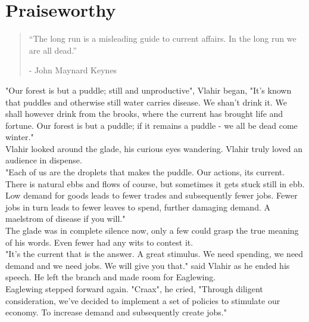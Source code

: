 \documentclass[smalldemyvopaper,11pt,twoside,onecolumn,openright,extrafontsizes]{memoir}
\newlength\drop
\begin{document}
\chapter{Praiseworthy}

\vspace{-1.3cm}
\begin{localsize}{10}
	\begin{quote}
		“The long run is a misleading guide to current affairs. In the long run we are all dead.” 
		\begin{flushright}- John Maynard Keynes \end{flushright}
	\end{quote} 
\end{localsize}
\vspace{1cm}

"Our forest is but a puddle; still and unproductive", Vlahir began, "It's known that puddles and otherwise still water carries disease. We shan't drink it.
We shall however drink from the brooks, where the current has brought life and fortune. Our forest is but a puddle; if it remains a puddle - we all be dead come winter."\\

Vlahir looked around the glade, his curious eyes wandering. Vlahir truly loved an audience in dispense.\\

"Each of us are the droplets that makes the puddle. Our actions, its current. There is natural ebbs and flows of course, but sometimes it gets stuck still in ebb. Low demand for goods leads to fewer trades and subsequently fewer jobs. Fewer jobs in turn leads to fewer leaves to spend, further damaging demand. A maelstrom of disease if you will."\\

The glade was in complete silence now, only a few could grasp the true meaning of his words. Even fewer had any wits to contest it. \\

"It's the current that is the answer. A great stimulus. We need spending, we need demand and we need jobs. We will give you that." said Vlahir as he ended his speech. He left the branch and made room for Eaglewing.\\

Eaglewing stepped forward again. "Craax", he cried, "Through diligent consideration, we've decided to implement a set of policies to stimulate our economy. To increase demand and subsequently create jobs."
\end{document}
